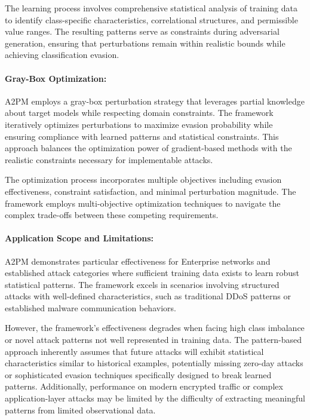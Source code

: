 The learning process involves comprehensive statistical analysis of training data to identify class-specific characteristics, correlational structures, and permissible value ranges. The resulting patterns serve as constraints during adversarial generation, ensuring that perturbations remain within realistic bounds while achieving classification evasion.

\paragraph{Gray-Box Optimization:}
A2PM employs a gray-box perturbation strategy that leverages partial knowledge about target models while respecting domain constraints. The framework iteratively optimizes perturbations to maximize evasion probability while ensuring compliance with learned patterns and statistical constraints. This approach balances the optimization power of gradient-based methods with the realistic constraints necessary for implementable attacks.

The optimization process incorporates multiple objectives including evasion effectiveness, constraint satisfaction, and minimal perturbation magnitude. The framework employs multi-objective optimization techniques to navigate the complex trade-offs between these competing requirements.

\paragraph{Application Scope and Limitations:}
A2PM demonstrates particular effectiveness for Enterprise networks and established attack categories where sufficient training data exists to learn robust statistical patterns. The framework excels in scenarios involving structured attacks with well-defined characteristics, such as traditional DDoS patterns or established malware communication behaviors.

However, the framework's effectiveness degrades when facing high class imbalance or novel attack patterns not well represented in training data. The pattern-based approach inherently assumes that future attacks will exhibit statistical characteristics similar to historical examples, potentially missing zero-day attacks or sophisticated evasion techniques specifically designed to break learned patterns. Additionally, performance on modern encrypted traffic or complex application-layer attacks may be limited by the difficulty of extracting meaningful patterns from limited observational data.

